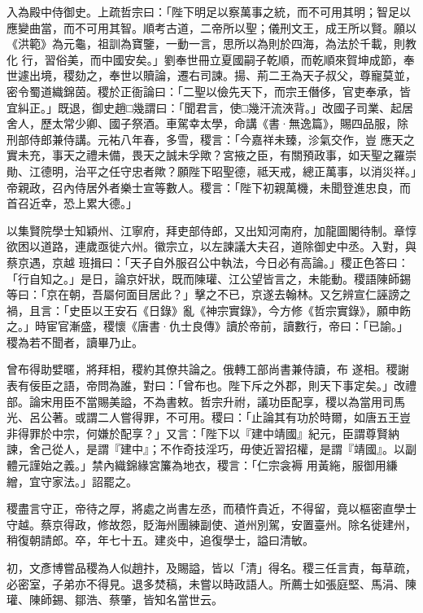 \begin{pinyinscope}
 入為殿中侍御史。上疏哲宗曰：「陛下明足以察萬事之統，而不可用其明；智足以應變曲當，而不可用其智。順考古道，二帝所以聖；儀刑文王，成王所以賢。願以《洪範》為元龜，祖訓為寶鑒，一動一言，思所以為則於四海，為法於千載，則教化
 行，習俗美，而中國安矣。」劉奉世冊立夏國嗣子乾順，而乾順來賀坤成節，奉世遽出境，稷劾之，奉世以贖論，遷右司諫。揚、荊二王為天子叔父，尊寵莫並，密令蜀道織錦茵。稷於正衙論曰：「二聖以儉先天下，而宗王僭侈，官吏奉承，皆宜糾正。」既退，御史趙□幾謂曰：「聞君言，使□幾汗流浹背。」改國子司業、起居舍人，歷太常少卿、國子祭酒。車駕幸太學，命講《書·無逸篇》，賜四品服，除刑部侍郎兼侍講。元祐八年春，多雪，稷言：「今嘉祥未臻，沴氣交作，豈
 應天之實未充，事天之禮未備，畏天之誠未孚歟？宮掖之臣，有關預政事，如天聖之羅崇勛、江德明，治平之任守忠者歟？願陛下昭聖德，祗天戒，總正萬事，以消災祥。」帝親政，召內侍居外者樂士宣等數人。稷言：「陛下初親萬機，未聞登進忠良，而首召近幸，恐上累大德。」



 以集賢院學士知穎州、江寧府，拜吏部侍郎，又出知河南府，加龍圖閣待制。章惇欲困以道路，連歲亟徙六州。徽宗立，以左諫議大夫召，道除御史中丞。入對，與蔡京遇，京越
 班揖曰：「天子自外服召公中執法，今日必有高論。」稷正色答曰：「行自知之。」是日，論京奸狀，既而陳瓘、江公望皆言之，未能動。稷語陳師錫等曰：「京在朝，吾屬何面目居此？」擊之不已，京遂去翰林。又乞辨宣仁誣謗之禍，且言：「史臣以王安石《日錄》亂《神宗實錄》，今方修《哲宗實錄》，願申飭之。」時宦官漸盛，稷懷《唐書·仇士良傳》讀於帝前，讀數行，帝曰：「已諭。」稷為若不聞者，讀畢乃止。



 曾布得助嬖暱，將拜相，稷約其僚共論之。俄轉工部尚書兼侍讀，布
 遂相。稷謝表有佞臣之語，帝問為誰，對曰：「曾布也。陛下斥之外郡，則天下事定矣。」改禮部。論宋用臣不當賜美謚，不為書敕。哲宗升祔，議功臣配享，稷以為當用司馬光、呂公著。或謂二人嘗得罪，不可用。稷曰：「止論其有功於時爾，如唐五王豈非得罪於中宗，何嫌於配享？」又言：「陛下以『建中靖國』紀元，臣謂尊賢納諫，舍己從人，是謂『建中』；不作奇技淫巧，毋使近習招權，是謂『靖國』。以副體元謹始之義。」禁內織錦緣宮簾為地衣，稷言：「仁宗衾褥
 用黃絁，服御用縑繒，宜守家法。」詔罷之。



 稷盡言守正，帝待之厚，將處之尚書左丞，而積忤貴近，不得留，竟以樞密直學士守越。蔡京得政，修故怨，貶海州團練副使、道州別駕，安置臺州。除名徙建州，稍復朝請郎。卒，年七十五。建炎中，追復學士，謚曰清敏。



 初，文彥博嘗品稷為人似趙抃，及賜謚，皆以「清」得名。稷三任言責，每草疏，必密室，子弟亦不得見。退多焚稿，未嘗以時政語人。所薦士如張庭堅、馬涓、陳瓘、陳師錫、鄒浩、蔡肇，皆知名當世云。




\end{pinyinscope}
